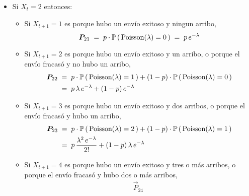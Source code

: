 \documentclass[ a4paper, twoside, 11pt]{article}
\begin{document}
\begin{problem}
\begin{itemize}
\begin{itemize}
\begin{align*}
(1-p) \cdot \Pr \, ( \, \Poisson(\lambda) = 2 \, ) \\
& = \; p \, \frac{\lambda^3 \, e^{-\lambda}}{3!} 
+ (1-p) \, \frac{\lambda^2 \, e^{-\lambda}}{2!} 
\end{align*}
\item Si $X_{t+1} = 4$ es porque hubo un env\'io exitoso y cuatro o m\'as arribos, o porque el env\'io fracas\'o y hubo tres o m\'as arribos, \iec 
\begin{align*}
\vec{P}_{14} \; 
& = \; p \cdot \Pr \, ( \, \Poisson(\lambda) \geq 4 \, ) +
(1-p) \cdot \Pr \, ( \, \Poisson(\lambda) \geq 3 \, ) \\
& = \; 
p \, \sum_{k=4}^{\infty} \frac{\lambda^k \, e^{-\lambda}}{k!} 
+ (1-p) \, \sum_{k=3}^{\infty} \frac{\lambda^k \, e^{-\lambda}}{k!} 
\end{align*}
\end{itemize}
\item Si $X_t = 2$ entonces: 
\begin{itemize}
\item Si $X_{t+1} = 1$ es porque hubo un env\'io exitoso y ningun arribo, \iec 
\[
{\boldsymbol{P}}_{21} \; = \;
p \cdot \mathbb{P} \, ( \, \text{Poisson}(\lambda) = 0 \, ) \; = \;
p \, e^{-\lambda}
\]
\item Si $X_{t+1} = 2$ es porque hubo un env\'io exitoso y un arribo, o porque el env\'io fracas\'o y no hubo un arribo, \iec 
\begin{align*}
{\boldsymbol{P}}_{22} \; 
& = \; p \cdot \mathbb{P} \, ( \, \text{Poisson}(\lambda) = 1 \, ) +
(1-p) \cdot \mathbb{P} \, ( \, \text{Poisson}(\lambda) = 0 \, ) \\
& = \; p \, \lambda \, e^{-\lambda} + (1-p) \, e^{-\lambda}
\end{align*}
\item Si $X_{t+1} = 3$ es porque hubo un env\'io exitoso y dos arribos, o porque el env\'io fracas\'o y hubo un arribo, \iec 
\begin{align*}
{\boldsymbol{P}}_{23} \; 
& = \; p \cdot \mathbb{P} \, ( \, \text{Poisson}(\lambda) = 2 \, ) +
(1-p) \cdot \mathbb{P} \, ( \, \text{Poisson}(\lambda) = 1 \, ) \\
& = \; p \, \frac{\lambda^2 \, e^{-\lambda}}{2!} 
+ (1-p) \, \lambda \, e^{-\lambda}
\end{align*}
\item Si $X_{t+1} = 4$ es porque hubo un env\'io exitoso y tres o m\'as arribos, o porque el env\'io fracas\'o y hubo dos o m\'as arribos, \iec 
\begin{align*}
\vec{P}_{24} \; 

\end{align*}
\end{itemize}
\end{itemize}
\end{problem}
\end{document}
